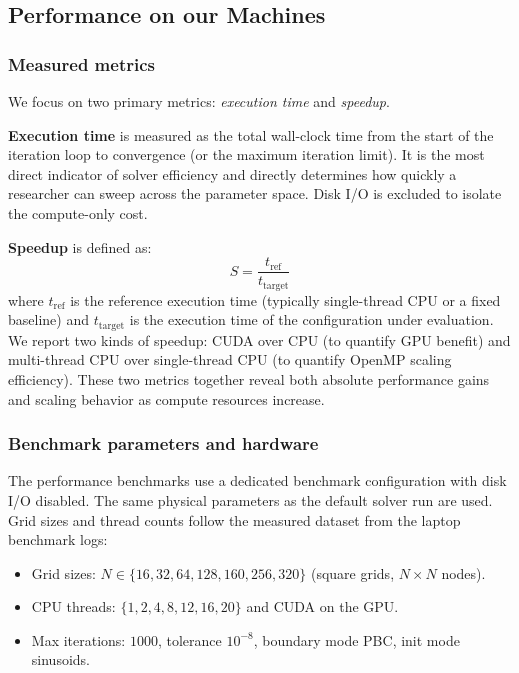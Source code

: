 \documentclass[conference]{IEEEtran}
\begin{document}
\subsection{Performance on our Machines}

\subsubsection{Measured metrics}

We focus on two primary metrics: \textit{execution time} and \textit{speedup}.

\textbf{Execution time} is measured as the total wall-clock time from the start of the iteration loop to convergence (or the maximum iteration limit). It is the most direct indicator of solver efficiency and directly determines how quickly a researcher can sweep across the parameter space. Disk I/O is excluded to isolate the compute-only cost.

\textbf{Speedup} is defined as:
\begin{equation}
S = \frac{t_{\text{ref}}}{t_{\text{target}}}
\end{equation}
where $t_{\text{ref}}$ is the reference execution time (typically single-thread CPU or a fixed baseline) and $t_{\text{target}}$ is the execution time of the configuration under evaluation. We report two kinds of speedup: CUDA over CPU (to quantify GPU benefit) and multi-thread CPU over single-thread CPU (to quantify OpenMP scaling efficiency). These two metrics together reveal both absolute performance gains and scaling behavior as compute resources increase.

\subsubsection{Benchmark parameters and hardware}

The performance benchmarks use a dedicated benchmark configuration with disk I/O disabled. The same physical parameters as the default solver run are used. Grid sizes and thread counts follow the measured dataset from the laptop benchmark logs:

\begin{itemize}
    \item Grid sizes: $N \in \{16, 32, 64, 128, 160, 256, 320\}$ (square grids, $N \times N$ nodes).
    \item CPU threads: $\{1, 2, 4, 8, 12, 16, 20\}$ and CUDA on the GPU.
    \item Max iterations: $1000$, tolerance $10^{-8}$, boundary mode PBC, init mode sinusoids.
\end{itemize}
\end{document}
